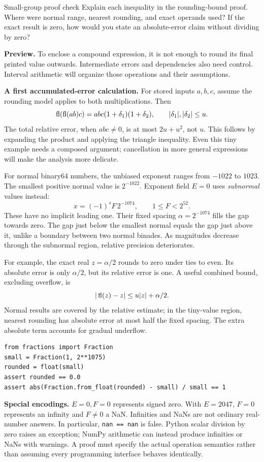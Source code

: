 \begin{question}{Small-group proof check}
Explain each inequality in the rounding-bound proof. Where were normal range,
nearest rounding, and exact operands used? If the exact result is zero, how would
you state an absolute-error claim without dividing by zero?
\end{question}
\textbf{Preview.} To enclose a compound expression, it is not enough to round its
final printed value outwards. Intermediate errors and dependencies also need
control. Interval arithmetic will organize those operations and their assumptions.

\textbf{A first accumulated-error calculation.} For stored inputs $a,b,c$, assume
the rounding model applies to both multiplications. Then
\[
 \operatorname{fl}(\operatorname{fl}(ab)c)=abc(1+\delta_1)(1+\delta_2),\qquad
 |\delta_1|,|\delta_2|\le u.
\]
The total relative error, when $abc\ne0$, is at most $2u+u^2$, not $u$.
This follows by expanding the product and applying the triangle inequality.
Even this tiny example needs a composed argument; cancellation in more general
expressions will make the analysis more delicate.

\newpage
{}
For normal binary64 numbers, the unbiased exponent ranges from $-1022$ to $1023$.
The smallest positive normal value is $2^{-1022}$. Exponent field $E=0$ uses
\emph{subnormal} values instead:
\[
 x=(-1)^s F\,2^{-1074},\qquad 1\le F<2^{52}.
\]
These have no implicit leading one. Their fixed spacing
$\alpha=2^{-1074}$ fills the gap towards zero. The gap just below the smallest
normal equals the gap just above it, unlike a boundary between two normal binades.
As magnitudes decrease through the subnormal region, relative precision deteriorates.

For example, the exact real $z=\alpha/2$ rounds to zero under ties to even.
Its absolute error is only $\alpha/2$, but its relative error is one.
A useful combined bound, excluding overflow, is
\[
 |\operatorname{fl}(z)-z|\le u|z|+\alpha/2.
\]
Normal results are covered by the relative estimate; in the tiny-value region,
nearest rounding has absolute error at most half the fixed spacing.
The extra absolute term accounts for gradual underflow.
\begin{lstlisting}
from fractions import Fraction
small = Fraction(1, 2**1075)
rounded = float(small)
assert rounded == 0.0
assert abs(Fraction.from_float(rounded) - small) / small == 1
\end{lstlisting}
\textbf{Special encodings.} $E=0,F=0$ represents signed zero. With $E=2047$,
$F=0$ represents an infinity and $F\ne0$ a NaN. Infinities and NaNs are not
ordinary real-number answers. In particular, \texttt{nan == nan} is false.
Python scalar division by zero raises an exception; NumPy arithmetic can instead
produce infinities or NaNs with warnings. A proof must specify the actual operation
semantics rather than assuming every programming interface behaves identically.

